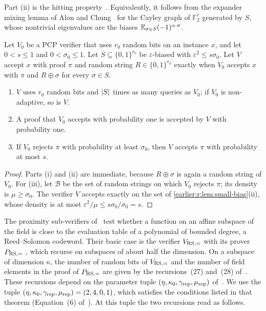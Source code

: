 Part (ii) is the hitting property~\cite[Lemma~4.7]{BV14}. Equivalently,
it follows from the expander mixing lemma of Alon and
Chung~\cite{AC88} for the Cayley graph of \(\mathbb F_2^r\) generated by
\(S\), whose nontrivial eigenvalues are the biases
\(\mathbb E_{\sigma\in S}(-1)^{\alpha\cdot\sigma}\).

\begin{lemma}\label{earlier:r:lem:patch-r}
Let \(V_0\) be a PCP verifier that uses \(r_0\) random bits on an
instance \(x\), and let \(0<s\le1\) and \(0<\sigma_0\le1\). Let
\(S\subseteq\{0,1\}^{r_0}\) be \(\varepsilon\)-biased with
\(\varepsilon^2\le s\sigma_0\). Let \(V\) accept \(x\) with proof \(\pi\)
and random string \(R\in\{0,1\}^{r_0}\) exactly when \(V_0\) accepts
\(x\) with \(\pi\) and \(R\oplus\sigma\) for every \(\sigma\in S\).
\begin{enumerate}[label=(\roman*)]
\item \(V\) uses \(r_0\) random bits and \(\left|S\right|\) times as many queries
as \(V_0\); if \(V_0\) is non-adaptive, so is \(V\).
\item A proof that \(V_0\) accepts with probability one is accepted by
\(V\) with probability one.
\item If \(V_0\) rejects \(\pi\) with probability at least \(\sigma_0\),
then \(V\) accepts \(\pi\) with probability at most \(s\).
\end{enumerate}
\end{lemma}
\begin{proof}
Parts (i) and (ii) are immediate, because \(R\oplus\sigma\) is again a
random string of \(V_0\). For (iii), let \(\mathcal B\) be the set of
random strings on which \(V_0\) rejects \(\pi\); its density is
\(\mu\ge\sigma_0\). The verifier \(V\) accepts exactly on the set of
\cref{earlier:r:lem:small-bias}(ii), whose density is at most
\(\varepsilon^2/\mu\le s\sigma_0/\sigma_0=s\).
\end{proof}

The proximity sub-verifiers of~\cite{BCGT13} test whether a function on
an affine subspace of the field is close to the evaluation table of a
polynomial of bounded degree, a Reed--Solomon codeword. Their basic
case is the verifier \(V_{\rm RS,=}\) with its prover \(P_{\rm RS,=}\)
\cite[Algorithms~16 and~7]{BCGT13}, which recurse on subspaces of
about half the dimension. On a subspace of dimension \(\kappa\), the
number of random bits of \(V_{\rm RS,=}\) and the number of field
elements in the proof of \(P_{\rm RS,=}\) are given by the
recursions~(27) and~(28) of~\cite[Section~C.8]{BCGT13}. These
recursions depend on the parameter tuple
\((\eta,\kappa_0,\gamma_{\rm rep},\mu_{\rm rep})\)
of~\cite[Theorem~11.1]{BCGT13}. We use the tuple
\((\eta,\kappa_0,\gamma_{\rm rep},\mu_{\rm rep})=(2,4,0,1)\), which
satisfies the conditions listed in that theorem (Equation~(6)
of~\cite[Theorem~11.3]{BCGT13}).
At this tuple the two recursions read as follows.

